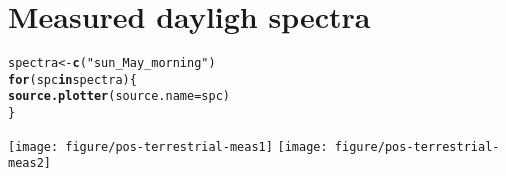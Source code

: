 \documentclass{article}\usepackage[]{graphicx}\usepackage[]{color}
\makeatletter
\newcommand{\hlstr}[1]{\textcolor[rgb]{0.192,0.494,0.8}{#1}}%
\newcommand{\hlstd}[1]{\textcolor[rgb]{0.345,0.345,0.345}{#1}}%
\newcommand{\hlkwa}[1]{\textcolor[rgb]{0.161,0.373,0.58}{\textbf{#1}}}%
\newcommand{\hlkwb}[1]{\textcolor[rgb]{0.69,0.353,0.396}{#1}}%
\newcommand{\hlkwc}[1]{\textcolor[rgb]{0.333,0.667,0.333}{#1}}%
\newcommand{\hlkwd}[1]{\textcolor[rgb]{0.737,0.353,0.396}{\textbf{#1}}}%
\newenvironment{kframe}{%
 \def\at@end@of@kframe{}%
 \ifinner\ifhmode%
  \def\at@end@of@kframe{\end{minipage}}%
  \begin{minipage}{\columnwidth}%
 \fi\fi%
 \def\FrameCommand##1{\hskip\@totalleftmargin \hskip-\fboxsep
 \colorbox{shadecolor}{##1}\hskip-\fboxsep
     \hskip-\linewidth \hskip-\@totalleftmargin \hskip\columnwidth}%
 \MakeFramed {\advance\hsize-\width
   \@totalleftmargin\z@ \linewidth\hsize
   \@setminipage}}%
 {\par\unskip\endMakeFramed%
 \at@end@of@kframe}
\newenvironment{knitrout}{}{} %
\makeatother
\begin{document}
\section{Measured dayligh spectra}

\begin{knitrout}\footnotesize
{}\color{fgcolor}\begin{kframe}
\begin{alltt}
\hlstd{spectra} \hlkwb{<-} \hlkwd{c}\hlstd{(}\hlstr{"sun_May_morning"}\hlstd{)}
\hlkwa{for} \hlstd{(spc} \hlkwa{in} \hlstd{spectra) \{}
    \hlkwd{source.plotter}\hlstd{(}\hlkwc{source.name} \hlstd{= spc)}
\hlstd{\}}
\end{alltt}
\end{kframe}

{\centering \texttt{[image: figure/pos-terrestrial-meas1]} 
\texttt{[image: figure/pos-terrestrial-meas2]} 

}



\end{knitrout}
\end{document}
